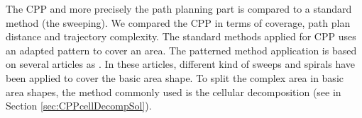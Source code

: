 The CPP and more precisely the path planning part is compared to a standard method (the sweeping). We compared the CPP  in terms of coverage, path plan distance and trajectory complexity.
 The standard methods applied for CPP uses an adapted pattern to cover an area. The patterned method application is based on several articles as \citep{144*torres2016,191*di2016,63*chao2008,66*galceran2013,119*choset1998}. In these articles, different kind of sweeps and spirals have been applied to cover the basic area shape. To split the complex area in basic area shapes, the method commonly used is the cellular decomposition (see in Section \ref{sec:CPPcellDecompSol}).  %

